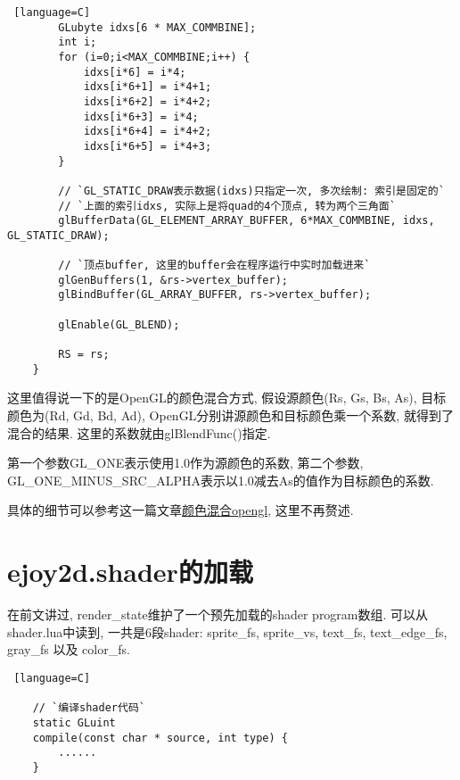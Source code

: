 {\begin {lstlisting} [language=C]
        GLubyte idxs[6 * MAX_COMMBINE];
        int i;
        for (i=0;i<MAX_COMMBINE;i++) {
            idxs[i*6] = i*4;
            idxs[i*6+1] = i*4+1;
            idxs[i*6+2] = i*4+2;
            idxs[i*6+3] = i*4;
            idxs[i*6+4] = i*4+2;
            idxs[i*6+5] = i*4+3;
        }

        // `GL_STATIC_DRAW表示数据(idxs)只指定一次, 多次绘制: 索引是固定的`
        // `上面的索引idxs, 实际上是将quad的4个顶点, 转为两个三角面`
        glBufferData(GL_ELEMENT_ARRAY_BUFFER, 6*MAX_COMMBINE, idxs, GL_STATIC_DRAW);

        // `顶点buffer, 这里的buffer会在程序运行中实时加载进来`
        glGenBuffers(1, &rs->vertex_buffer);
        glBindBuffer(GL_ARRAY_BUFFER, rs->vertex_buffer);

        glEnable(GL_BLEND);

        RS = rs;
    }

    \end {lstlisting} \par

    {这里值得说一下的是OpenGL的颜色混合方式, 假设源颜色(Rs, Gs, Bs, As), 目标颜色为(Rd, Gd, Bd, Ad), OpenGL分别讲源颜色和目标颜色乘一个系数, 就得到了混合的结果. 这里的系数就由glBlendFunc()指定. }\par

    {第一个参数GL\_ONE表示使用1.0作为源颜色的系数, 第二个参数, GL\_ONE\_MINUS\_SRC\_ALPHA表示以1.0减去As的值作为目标颜色的系数. } \par

    {具体的细节可以参考这一篇文章\href{http://blog.csdn.net/aurora_mylove/article/details/1700540}{颜色混合opengl}, 这里不再赘述. }\par

}

\section* {\ZHH ejoy2d.shader的加载} {

    {在前文讲过, render_state维护了一个预先加载的shader program数组. 可以从shader.lua中读到, 一共是6段shader: sprite_fs, sprite_vs, text_fs, text_edge_fs, gray_fs 以及 color_fs. }\par

    \begin {lstlisting} [language=C]

    // `编译shader代码`
    static GLuint
    compile(const char * source, int type) {
        ......
    }


\end{lstlisting}}
